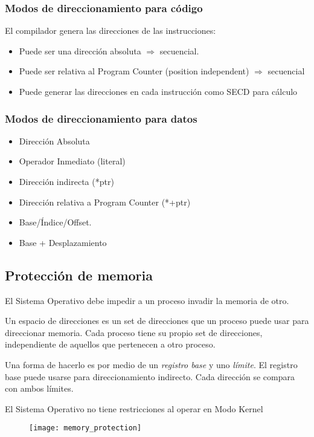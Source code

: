\documentclass[a4paper, twoside]{article}
\begin{document}
\subsubsection{Modos de direccionamiento para código}
El compilador genera las direcciones de las instrucciones:
\begin{itemize}
	\item Puede ser una dirección absoluta $\Rightarrow$ secuencial.
	\item Puede ser relativa al Program Counter (position independent) $\Rightarrow$ secuencial
	\item Puede generar las direcciones en cada instrucción como SECD para cálculo
\end{itemize}

\subsubsection{Modos de direccionamiento para datos}
\begin{itemize}
	\item Dirección Absoluta
	\item Operador Inmediato (literal)
	\item Dirección indirecta (*ptr)
	\item Dirección relativa a Program Counter (*+ptr)
	\item Base/Índice/Offset.
	\item Base + Desplazamiento
\end{itemize}

\subsection{Protección de memoria}
El Sistema Operativo debe impedir a un proceso invadir la memoria de otro.

Un espacio de direcciones es un set de direcciones que un proceso puede usar para direccionar memoria. Cada proceso tiene su propio set de direcciones, independiente de aquellos que pertenecen a otro proceso.

Una forma de hacerlo es por medio de un \emph{registro base} y uno \emph{límite}. El registro base puede usarse para direccionamiento indirecto. Cada dirección se compara con ambos límites.

El Sistema Operativo no tiene restricciones al operar en Modo Kernel

\begin{figure}[h]
	\centering
	\texttt{[image: memory\_protection]}
	\label{fig:memory_protection}
\end{figure}
\end{document}
